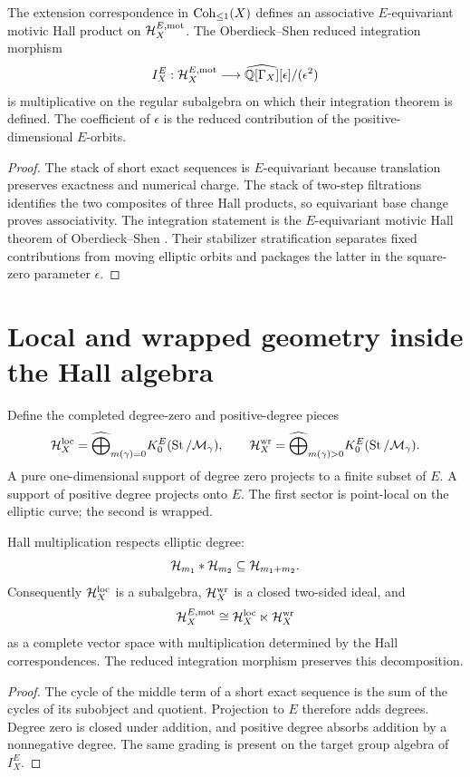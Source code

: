 \begin{theorem}
The extension correspondence in $\operatorname{Coh}_{\leq1}(X)$ defines an associative $E$-equivariant motivic Hall product on $\mathcal H_X^{E,\mathrm{mot}}$.  The Oberdieck--Shen reduced integration morphism
\[
 I_X^E:\mathcal H_X^{E,\mathrm{mot}}
 \longrightarrow
 \widehat{\mathbb Q[\Gamma_X]}[\epsilon]/(\epsilon^2)
\]
is multiplicative on the regular subalgebra on which their integration theorem is defined.  The coefficient of $\epsilon$ is the reduced contribution of the positive-dimensional $E$-orbits.
\end{theorem}
\begin{proof}
The stack of short exact sequences is $E$-equivariant because translation preserves exactness and numerical charge.  The stack of two-step filtrations identifies the two composites of three Hall products, so equivariant base change proves associativity.  The integration statement is the $E$-equivariant motivic Hall theorem of Oberdieck--Shen \cite{OberdieckShen}.  Their stabilizer stratification separates fixed contributions from moving elliptic orbits and packages the latter in the square-zero parameter $\epsilon$.
\end{proof}

\chapter{Local and wrapped geometry inside the Hall algebra}
Define the completed degree-zero and positive-degree pieces
\[
 \mathcal H_X^{\mathrm{loc}}
 =\widehat\bigoplus_{m(\gamma)=0}
 K_0^E(\operatorname{St}/\mathcal M_\gamma),
 \qquad
 \mathcal H_X^{\mathrm{wr}}
 =\widehat\bigoplus_{m(\gamma)>0}
 K_0^E(\operatorname{St}/\mathcal M_\gamma).
\]
A pure one-dimensional support of degree zero projects to a finite subset of $E$.  A support of positive degree projects onto $E$.  The first sector is point-local on the elliptic curve; the second is wrapped.

\begin{theorem}
Hall multiplication respects elliptic degree:
\[
 \mathcal H_{m_1}*\mathcal H_{m_2}\subseteq\mathcal H_{m_1+m_2}.
\]
Consequently $\mathcal H_X^{\mathrm{loc}}$ is a subalgebra, $\mathcal H_X^{\mathrm{wr}}$ is a closed two-sided ideal, and
\[
 \mathcal H_X^{E,\mathrm{mot}}
 \cong
 \mathcal H_X^{\mathrm{loc}}\ltimes\mathcal H_X^{\mathrm{wr}}
\]
as a complete vector space with multiplication determined by the Hall correspondences.  The reduced integration morphism preserves this decomposition.
\end{theorem}
\begin{proof}
The cycle of the middle term of a short exact sequence is the sum of the cycles of its subobject and quotient.  Projection to $E$ therefore adds degrees.  Degree zero is closed under addition, and positive degree absorbs addition by a nonnegative degree.  The same grading is present on the target group algebra of $I_X^E$.
\end{proof}

